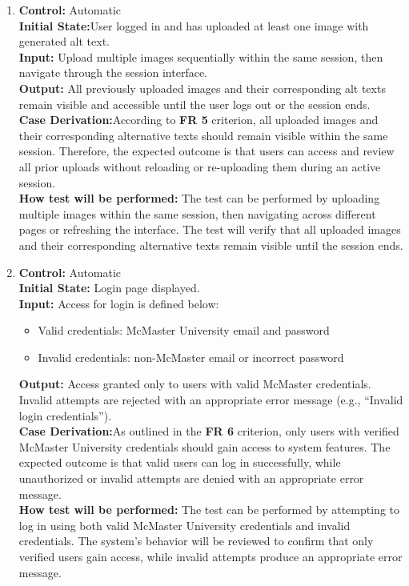 \documentclass[12pt, titlepage]{article}
\begin{document}
\begin{enumerate}[label=FR-ST \arabic*., wide=0pt, leftmargin=*]
  \item{}
    {\bf Control:} Automatic\\
    {\bf Initial State:}User logged in and has uploaded at least one
    image with generated alt text.\\
    {\bf Input:} Upload multiple images sequentially within the same
    session, then navigate through the session interface.\\
    {\bf Output:} All previously uploaded images and their
    corresponding alt texts remain visible and accessible until the
    user logs out or the session ends.\\
    {\bf  Case Derivation:}According to \textbf{FR 5} criterion, all
    uploaded images and their corresponding alternative texts should
    remain visible within the same session. Therefore, the expected
    outcome is that users can access and review all prior uploads
    without reloading or re-uploading them during an active session.\\
    {\bf How test will be performed:} The test can be performed by
    uploading multiple images within the same session, then
    navigating across different pages or refreshing the interface.
    The test will verify that all uploaded images and their
    corresponding alternative texts remain visible until the session ends.\\

  \item{}
    {\bf Control:} Automatic\\
    {\bf Initial State:} Login page displayed.\\
    {\bf Input:} Access for login is defined below:
    \begin{itemize}
      \item Valid credentials: McMaster University email and password
      \item Invalid credentials: non-McMaster email or incorrect password
    \end{itemize}
    {\bf Output:} Access granted only to users with valid McMaster
    credentials. Invalid attempts are rejected with an appropriate
    error message (e.g., “Invalid login credentials”).\\
    {\bf  Case Derivation:}As outlined in the \textbf{FR 6}
    criterion, only users with verified McMaster University
    credentials should gain access to system features. The expected
    outcome is that valid users can log in successfully, while
    unauthorized or invalid attempts are denied with an appropriate
    error message.\\
    {\bf How test will be performed:} The test can be performed by
    attempting to log in using both valid McMaster University
    credentials and invalid credentials. The system’s behavior will
    be reviewed to confirm that only verified users gain access,
    while invalid attempts produce an appropriate error message.\\
\end{enumerate}
\end{document}
